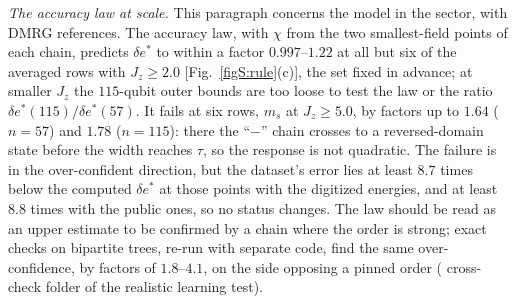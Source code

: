 \documentclass[aps,prx,onecolumn,10pt,nofootinbib,longbibliography,floatfix]{revtex4-2}
\theoremstyle{remark}
\newcommand{\Jz}{J_z}
\newcommand{\ms}{m_s}
\newcommand{\des}{\delta e^{*}}
\begin{document}
\emph{The accuracy law at scale.} This paragraph concerns the model in the sector, with DMRG references. The accuracy law, with $\chi$ from the two smallest-field points of each chain,
predicts $\des$ to within a factor $0.997$--$1.22$ at all but six of the averaged rows with $\Jz\ge2.0$ %
[Fig.~\ref{figS:rule}(c)], the set fixed in advance; at smaller $\Jz$ the $115$-qubit outer bounds are too loose to
test the law or the ratio $\des(115)/\des(57)$. It fails at six rows, $\ms$ at $\Jz\ge5.0$, by factors up to $1.64$ ($n=57$) and $1.78$ %
($n=115$): there the ``$-$'' chain crosses to a reversed-domain state before the width reaches $\tau$, so the response
is not quadratic. The failure is in the over-confident direction, but the dataset's error lies at least $8.7$ times %
below the computed $\des$ at those points with the digitized energies, and at least $8.8$ times with the public %
ones, so no status changes. The law should be read as an upper estimate to be
confirmed by a chain where the order is strong; exact checks on bipartite trees, re-run with separate code, find the
same over-confidence, by factors of $1.8$--$4.1$, on the side opposing a pinned order (%
cross-check folder of the realistic learning test).
\end{document}
